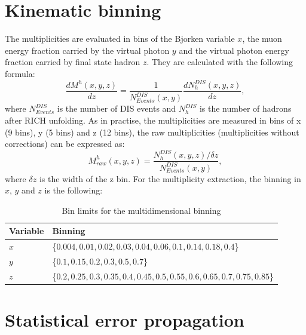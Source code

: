 
\section{Kinematic binning}

The multiplicities are evaluated in bins of the Bjorken variable $x$, the muon energy fraction carried by the virtual photon $y$ and the virtual photon energy fraction carried by final state hadron $z$. They are calculated with the following formula:
%
\begin{equation}
  \frac{dM^h(x,y,z)}{dz}=\frac{1}{N^{DIS}_{Events}(x,y)}\frac{dN^{DIS}_{h}(x,y,z)}{dz},
\end{equation}
%
where $N^{DIS}_{Events}$ is the number of DIS events and $N^{DIS}_{h}$ is the number of
hadrons after RICH unfolding. As in practise, the multiplicities are measured in bins of
x (9 bins), y (5 bins) and z (12 bins), the raw multiplicities (multiplicities without corrections) can be expressed as:
%
\begin{equation}
  M^h_{raw}(x,y,z) = \frac{N^{DIS}_{h}(x,y,z)/\delta z}{N^{DIS}_{Events}(x,y)},
\end{equation}
%
where $\delta z$ is the width of the z bin. For the multiplicity extraction, the binning in
$x$, $y$ and $z$ is the following:

\begin{table}[!h]
  \centering
  \caption{Bin limits for the multidimensional binning}
  \label{tab:kinbinning}
  \begin{tabular}{ll}
    \hline
    \hline
    Variable & Binning \\
    \hline
    \hline
    $x$ & \{$0.004,0.01,0.02,0.03,0.04,0.06,0.1,0.14,0.18,0.4$\} \\
    $y$ & \{$0.1,0.15,0.2,0.3,0.5,0.7$\} \\
    $z$ & \{$0.2,0.25,0.3,0.35,0.4,0.45,0.5,0.55,0.6,0.65,0.7,0.75,0.85$\} \\
    \hline
    \hline
  \end{tabular}
\end{table}


\section{Statistical error propagation}

